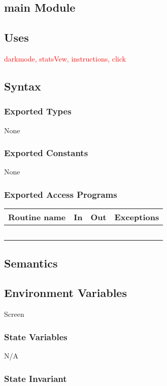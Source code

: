 \documentclass[12pt]{article}
\begin{document}
\subsection* {main Module}

\subsection* {Uses}

\textcolor{red}{darkmode, statsVew, instructions, click}

\subsection* {Syntax}

\subsubsection* {Exported Types}

None

\subsubsection* {Exported Constants}

None

\subsubsection* {Exported Access Programs}
\begin{tabular}{| l | l | l | p{6cm} |}
\hline
\textbf{Routine name} & \textbf{In} & \textbf{Out} & \textbf{Exceptions}\\
\hline
~ & & ~ &  \\
\hline
\end{tabular}


\subsection* {Semantics}

\subsection*{Environment Variables}
Screen
\subsubsection* {State Variables}
N/A

\subsubsection* {State Invariant}
\end{document}
